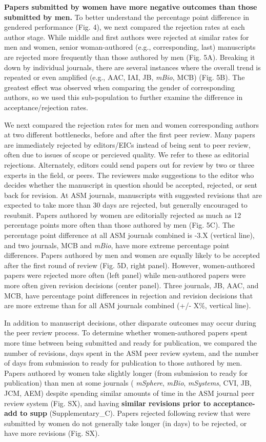 \documentclass[11pt,]{article}
\begin{document}
\textbf{Papers submitted by women have more negative outcomes than those
submitted by men.} To better understand the percentage point difference
in gendered performance (Fig. 4), we next compared the rejection rates
at each author stage. While middle and first authors were rejected at
similar rates for men and women, senior woman-authored (e.g.,
corresponding, last) manuscripts are rejected more frequently than those
authored by men (Fig. 5A). Breaking it down by individual journals,
there are several instances where the overall trend is repeated or even
amplified (e.g., AAC, IAI, JB, \emph{mBio}, MCB) (Fig. 5B). The greatest
effect was observed when comparing the gender of corresponding authors,
so we used this sub-population to further examine the difference in
acceptance/rejection rates.

We next compared the rejection rates for men and women corresponding
authors at two different bottlenecks, before and after the first peer
review. Many papers are immediately rejected by editors/EICs instead of
being sent to peer review, often due to issues of scope or percieved
quality. We refer to these as editorial rejections. Alternately, editors
could send papers out for review by two or three experts in the field,
or peers. The reviewers make suggestions to the editor who decides
whether the manuscript in question should be accepted, rejected, or sent
back for revision. At ASM journals, manuscripts with suggested revisions
that are expected to take more than 30 days are rejected, but generally
encouraged to resubmit. Papers authored by women are editorially
rejected as much as 12 percentage points more often than those authored
by men (Fig. 5C). The percentage point difference at all ASM journals
combined is -3.X (vertical line), and two journals, MCB and \emph{mBio},
have more extreme percentage point differences. Papers authored by men
and women are equally likely to be accepted after the first round of
review (Fig. 5D, right panel). However, women-authored papers were
rejected more often (left panel) while men-authored papers were more
often given revision decisions (center panel). Three journals, JB, AAC,
and MCB, have percentage point differences in rejection and revision
decisions that are more extreme than for all ASM journals combined (+/-
X\%, vertical line).

In addition to manuscript decisions, other disparate outcomes may occur
during the peer review process. To determine whether women-authored
papers spent more time between being submitted and ready for
publication, we compared the number of revisions, days spent in the ASM
peer review system, and the number of days from submission to ready for
publication to those authored by men. Papers authored by women take
slightly longer (from submission to ready for publication) than men at
some journals ( \emph{mSphere}, \emph{mBio}, \emph{mSystems}, CVI, JB,
JCM, AEM) despite spending similar amounts of time in the ASM journal
peer review system (Fig. SX), and having \textbf{similar revisions prior
to acceptance-add to supp} (Supplementary\_C). Papers rejected following
review that were submitted by women do not generally take longer (in
days) to be rejected, or have more revisions (Fig. SX).
\end{document}
